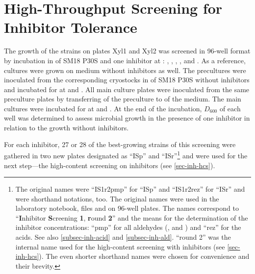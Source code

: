 \section{High-Throughput Screening for Inhibitor Tolerance\label{sec-inh-hts}}
The growth of the strains on plates Xyl1 and Xyl2 was screened in 96-well format by incubation in  of SM18 P30S and one inhibitor at : \fur{}, \hmf{}, \van{}, \acet{}, \fora{} and \laev{}. As a reference, cultures were grown on medium without inhibitors as well. The precultures were inoculated from the corresponding cryostocks in  of SM18 P30S without inhibitors and incubated for  at  and . All main culture plates were inoculated from the same preculture plates by transferring  of the preculture to  of the medium. The main cultures were incubated for  at  and . At the end of the incubation, $D_{600}$ of each well was determined to assess microbial growth in the presence of one inhibitor in relation to the growth without inhibitors.

For each inhibitor, \num{27} or \num{28} of the best-growing strains of this screening were gathered in two new plates designated as \enquote{ISp} and \enquote{ISr}\footnote{
	The original names were \enquote{IS1r2pmp} for \enquote{ISp} and \enquote{IS1r2rez} for \enquote{ISr} and were shorthand notations, too. The original names were used in the laboratory notebook, files and on 96-well plates. The names correspond to \enquote{\textbf{I}nhibitor \textbf{S}creening \textbf{1}, \textbf{r}ound \textbf{2}} and the means for the determination of the inhibitor concentrations: \enquote{pmp} for all aldehydes (\fur{}, \hmf{} and \van{}) and \enquote{rez} for the acids. See also \vref{subsec-inh-acid} and \vref{subsec-inh-ald}. \enquote{round 2} was the internal name used for the high-content screening with inhibitors (see \vref{sec-inh-hcs}). The even shorter shorthand names were chosen for convenience and their brevity.
}
and were used for the next step---the high-content screening on inhibitors (see \vref{sec-inh-hcs}).

